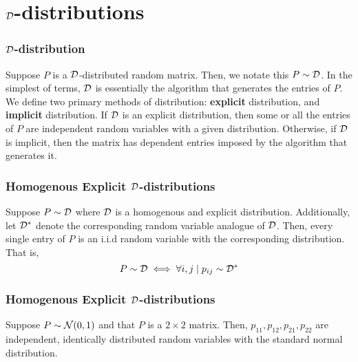 

\section{$\mathcal{D}$-distributions}
\begin{frame}
\frametitle{$\mathcal{D}$-distribution}

  \begin{alertblock}{}
    Suppose $P$ is a $\mathcal{D}$-distributed random matrix. Then, we notate this $P \sim \mathcal{D}$. In the simplest of terms, $\mathcal{D}$ is essentially the algorithm that generates the entries of $P$.
    We define two primary methods of distribution: \textbf{explicit} distribution, and \textbf{implicit} distribution.
    If $\mathcal{D}$ is an explicit distribution, then some or all the entries of $P$ are independent random variables with a given distribution.
    Otherwise, if $\mathcal{D}$ is implicit, then the matrix has dependent entries imposed by the algorithm that generates it.
  \end{alertblock}

\end{frame}
\begin{frame} \frametitle{Homogenous Explicit $\mathcal{D}$-distributions}

  \begin{alertblock}{}
    Suppose $P \sim \mathcal{D}$ where $\mathcal{D}$ is a homogenous and explicit distribution. Additionally, let $\mathcal{D}^*$ denote the corresponding random variable analogue of $\mathcal{D}$.
    Then, every single entry of $P$ is an i.i.d random variable with the corresponding distribution. That is,
    $$ P \sim \mathcal{D} \iff \forall i,j \mid p_{ij} \sim \mathcal{D}^* $$
  \end{alertblock}

\end{frame}
\begin{frame} \frametitle{Homogenous Explicit $\mathcal{D}$-distributions}

  \begin{examples}
  Suppose $P \sim \mathcal{N}(0,1)$ and that $P$ is a $2 \times 2$ matrix.
  Then, $p_{11}, p_{12}, p_{21}, p_{22}$ are independent, identically distributed random variables with the standard normal distribution.
  \end{examples}

\end{frame}
